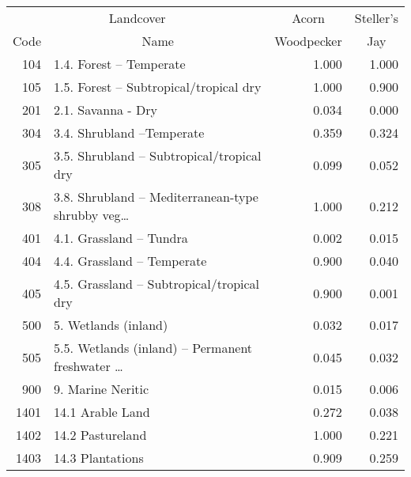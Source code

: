 \begin{tabular}{rlrr}
\toprule
\multicolumn{2}{c}{Landcover} & \multicolumn{1}{c}{Acorn} & \multicolumn{1}{c}{Steller's} \\
\multicolumn{1}{c}{Code} & \multicolumn{1}{c}{Name} & \multicolumn{1}{c}{Woodpecker} & \multicolumn{1}{c}{Jay} \\
\midrule
          104 &                            1.4. Forest – Temperate &             1.000 &          1.000 \\
          105 &             1.5. Forest – Subtropical/tropical dry &             1.000 &          0.900 \\
          201 &                                 2.1. Savanna - Dry &             0.034 &          0.000 \\
          304 &                          3.4. Shrubland –Temperate &             0.359 &          0.324 \\
          305 &          3.5. Shrubland – Subtropical/tropical dry &             0.099 &          0.052 \\
          308 & 3.8. Shrubland – Mediterranean-type shrubby veg\ldots &             1.000 &          0.212 \\
          401 &                            4.1. Grassland – Tundra &             0.002 &          0.015 \\
          404 &                         4.4. Grassland – Temperate &             0.900 &          0.040 \\
          405 &          4.5. Grassland – Subtropical/tropical dry &             0.900 &          0.001 \\
          500 &                               5. Wetlands (inland) &             0.032 &          0.017 \\
          505 & 5.5. Wetlands (inland) – Permanent freshwater \ldots &             0.045 &          0.032 \\
          900 &                                  9. Marine Neritic &             0.015 &          0.006 \\
         1401 &                                   14.1 Arable Land &             0.272 &          0.038 \\
         1402 &                                   14.2 Pastureland &             1.000 &          0.221 \\
         1403 &                                   14.3 Plantations &             0.909 &          0.259 \\
\bottomrule
\end{tabular}
